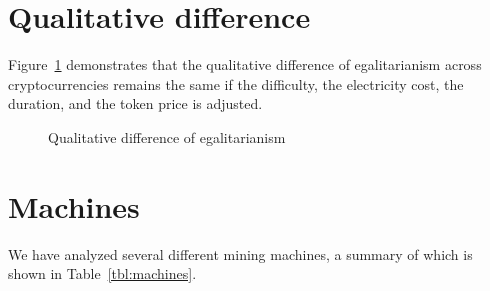 \appendix
\section{Qualitative difference}\label{sec:appendix-qualitative-difference}

Figure~\ref{fig:different-settings} demonstrates that the qualitative difference of
egalitarianism across cryptocurrencies remains the same if the difficulty,
the electricity cost, the duration, and the token price is adjusted.

\begin{figure}
  \caption{Qualitative difference of egalitarianism}
  \label{fig:different-settings}
\end{figure}

\section{Machines}\label{sec:appendix-data}

We have analyzed several different mining machines, a summary of which is shown in Table~\ref{tbl:machines}.



